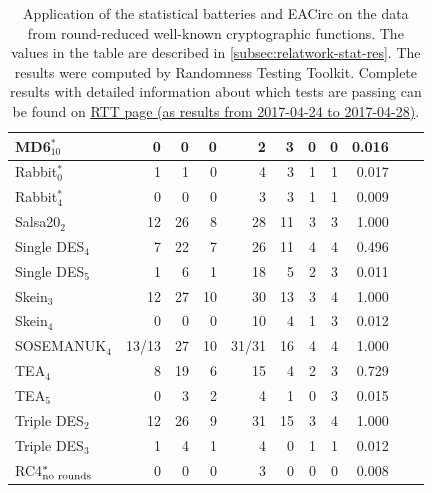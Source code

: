 \documentclass[
  print, %
  Table,   %
  nolof,     %
  nolot,     %
  11pt, %
  oneside  %
]{fithesis3}
\newcommand{\fd}{\cellcolor{myred!15}}
\newcommand{\fn}{\cellcolor{mygreen!20}}
\begin{document}
\begin{table}[H]
{\begin{tabular}{@{}l|rrrrrrrrrr@{}}
MD6$_{10}^{\ast}$                &  0    \fn &  0 \fn &  0 \fn   &  2    \fn &  3 \fd & 0 \fn & 0 \fn & 0.016 \fn \\ \hline
Rabbit$_{0}^{\ast}$              &  1    \fn &  1 \fn &  0 \fn   &  4    \fd &  3 \fd & 1 \fn & 1 \fn & 0.017 \fn \\
Rabbit$_{4}^{\ast}$              &  0    \fn &  0 \fn &  0 \fn   &  3    \fn &  3 \fd & 1 \fn & 1 \fn & 0.009 \fn \\ \hline
Salsa20$_{2}$                    & 12    \fd & 26 \fd &  8 \fd   & 28    \fd & 11 \fd & 3 \fd & 3 \fd & 1.000 \fd \\ \hline
Single DES$_{4}$                 &  7    \fd & 22 \fd &  7 \fd   & 26    \fd & 11 \fd & 4 \fd & 4 \fd & 0.496 \fd \\
Single DES$_{5}$                 &  1    \fn &  6 \fd &  1 \fn   & 18    \fd &  5 \fd & 2 \fd & 3 \fd & 0.011 \fn \\ \hline
Skein$_{3}$                      & 12    \fd & 27 \fd & 10 \fd   & 30    \fd & 13 \fd & 3 \fd & 4 \fd & 1.000 \fd \\
Skein$_{4}$                      &  0    \fn &  0 \fn &  0 \fn   & 10    \fd &  4 \fd & 1 \fn & 3 \fd & 0.012 \fn \\ \hline
SOSEMANUK$_{4}$                  & 13/13 \fd & 27 \fd & 10 \fd   & 31/31 \fd & 16 \fd & 4 \fd & 4 \fd & 1.000 \fd \\ \hline
TEA$_{4}$                        &  8    \fd & 19 \fd &  6 \fd   & 15    \fd &  4 \fd & 2 \fd & 3 \fd & 0.729 \fd \\
TEA$_{5}$                        &  0    \fn &  3 \fn &  2 \fn   &  4    \fd &  1 \fn & 0 \fn & 3 \fd & 0.015 \fn \\ \hline
Triple DES$_{2}$                 & 12    \fd & 26 \fd &  9 \fd   & 31    \fd & 15 \fd & 3 \fd & 4 \fd & 1.000 \fd \\
Triple DES$_{3}$                 &  1    \fn &  4 \fd &  1 \fn   &  4    \fd &  0 \fn & 1 \fn & 1 \fn & 0.012 \fn \\ \hline
RC4$_{\textnormal{no rounds}}^{\ast}$ &  0 \fn &  0 \fn &  0 \fn &  3    \fn &  0 \fn & 0 \fn & 0 \fn & 0.008 \fn \\

\end{tabular}
}

\caption{Application of the statistical batteries and EACirc on the data from round-reduced well-known cryptographic functions. 
The values in the table are described in \cref{subsec:relatwork-stat-res}.
The results were computed by Randomness Testing Toolkit. Complete results with detailed information about which tests are passing can be found on \href{http://rtt.ics.muni.cz/ViewResults/?created_from=2017-04-24+12\%3A00\%3A00&created_to=2017-04-29+00\%3A00\%3A00}{RTT page (as results from 2017-04-24 to 2017-04-28)}.}
\label{table:res-batteries}
\end{table}
\end{document}
